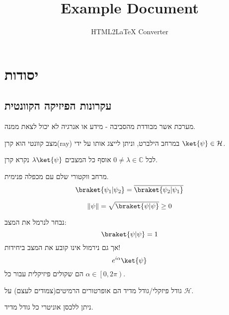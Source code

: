 \documentclass{tstextbook}
\begin{document}
\title{Example Document}
\author{HTML2LaTeX Converter}
\maketitle

\chapter{יסודות}

\section{עקרונות הפיזיקה הקוונטית}

\begin{definition}
מערכת אשר מבודדת מהסביבה - מידע או אנרגיה לא יכול לצאת ממנה.

\end{definition}
\begin{definition}
מצב קוונטי הוא קרן(ray) במרחב הילברט, וניתן לייצג אותו על ידי \(\ket{\psi} \in \mathcal{H}\).

\end{definition}
\begin{definition}[קרן]
לכל \(0\neq \lambda \in \mathbb{C}\) אוסף כל המצבים \(\lambda \ket{ \psi}\) נקרא קרן.

\end{definition}
\begin{reminder}
מרחב ווקטורי שלם עם מכפלה פנימית.
$$\braket{ \psi_{1} | \psi_{2} } =\overline{\braket{ \psi_{2} | \psi_{1} } } $$

\end{reminder}
\begin{definition}
$$\left\lVert  \psi  \right\rVert =\sqrt{ \braket{ \psi | \psi }  }\geq 0 $$

\end{definition}
\begin{remark}
נבחר לנרמל את המצב:
$$\braket{ \psi | \psi } =1$$
אך גם נירמול אינו קובע את המצב ביחידות!
$$e^{ i\alpha }\ket{\psi} $$
הם שקולים פיזיקלית עבור כל \(\alpha \in \left[ 0,2\pi \right)\).

\end{remark}
\begin{definition}
גודל פיזקלי/גודל מדיד הם אופרטורים הרמיטים(צמודים לעצם) על \(\mathcal{H}\).

\end{definition}
\begin{corollary}
ניתן ללכסן אוניטרי כל גודל מדיד.

\end{corollary}
\end{document}
